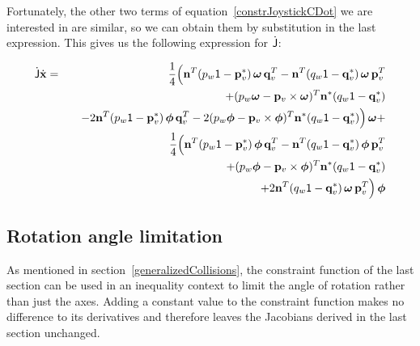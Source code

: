 Fortunately, the other two terms of equation~\ref{constrJoystickCDot} we are interested in are
similar, so we can obtain them by substitution in the last expression. This gives us the
following expression for $\dot{\mathsf{J}}$:

\begin{eqnarray}
\dot{\m{J}}\dot{\ve{x}} &=&
    \frac{1}{4}\Big( \ve{n}^T (p_w\m{1} - \dual{\ve{p}_v})\, \ve{\omega}\,\ve{q}_v^T
    -\ve{n}^T (q_w\m{1} - \dual{\ve{q}_v})\, \ve{\omega}\,\ve{p}_v^T \nonumber\\*&&\quad
    +(p_w\ve{\omega} - \ve{p}_v\times\ve{\omega})^T \dual{\ve{n}} (q_w\m{1} - \dual{\ve{q}_v})
    \nonumber\\*&&\quad
    -2\ve{n}^T (p_w\m{1} - \dual{\ve{p}_v})\, \ve{\phi}\,\ve{q}_v^T
    -2(p_w\ve{\phi} - \ve{p}_v\times\ve{\phi})^T \dual{\ve{n}} (q_w\m{1} - \dual{\ve{q}_v})
    \Big)\, \ve{\omega} + \nonumber\\*&&
    \frac{1}{4}\Big( \ve{n}^T (p_w\m{1} - \dual{\ve{p}_v})\, \ve{\phi}\,\ve{q}_v^T
    -\ve{n}^T (q_w\m{1} - \dual{\ve{q}_v})\, \ve{\phi}\,\ve{p}_v^T \nonumber\\*&&\quad
    +(p_w\ve{\phi} - \ve{p}_v\times\ve{\phi})^T \dual{\ve{n}} (q_w\m{1} - \dual{\ve{q}_v})
    \nonumber\\*&&\quad
    +2\ve{n}^T (q_w\m{1} - \dual{\ve{q}_v})\, \ve{\omega}\,\ve{p}_v^T \Big)\,\ve{\phi}
\end{eqnarray}


\subsection{Rotation angle limitation}

As mentioned in section~\ref{generalizedCollisions}, the constraint function of the last section
can be used in an inequality context to limit the angle of rotation rather than just the axes.
Adding a constant value to the constraint function makes no difference to its derivatives and
therefore leaves the Jacobians derived in the last section unchanged.

